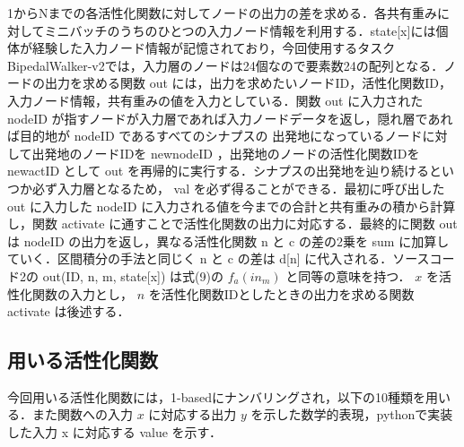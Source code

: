 1からNまでの各活性化関数に対してノードの出力の差を求める．各共有重みに対してミニバッチのうちのひとつの入力ノード情報を利用する．state[x]には個体が経験した入力ノード情報が記憶されており，今回使用するタスクBipedalWalker-v2\cite{OpenAI}では，入力層のノードは24個なので要素数24の配列となる．ノードの出力を求める関数 out には，出力を求めたいノードID，活性化関数ID，入力ノード情報，共有重みの値を入力としている．関数 out に入力された nodeID が指すノードが入力層であれば入力ノードデータを返し，隠れ層であれば目的地が nodeID であるすべてのシナプスの 出発地になっているノードに対して出発地のノードIDを newnodeID ，出発地のノードの活性化関数IDを newactID として out を再帰的に実行する．シナプスの出発地を辿り続けるといつか必ず入力層となるため， val を必ず得ることができる．最初に呼び出した out に入力した nodeID に入力される値を今までの合計と共有重みの積から計算し，関数 activate に通すことで活性化関数の出力に対応する．最終的に関数 out は nodeID の出力を返し，異なる活性化関数 n と c の差の2乗を sum に加算していく．区間積分の手法と同じく n と c の差は d[n] に代入される．ソースコード2の out(ID, n, m, state[x]) は式(9)の $ f_{a}(in_{m}) $ と同等の意味を持つ． $ x $ を活性化関数の入力とし， $ n $ を活性化関数IDとしたときの出力を求める関数 activate は後述する．

\clearpage
\subsection{用いる活性化関数}
今回用いる活性化関数には，1-basedにナンバリングされ，以下の10種類を用いる．また関数への入力 $ x $ に対応する出力 $ y $ を示した数学的表現，pythonで実装した入力 x に対応する value を示す．

